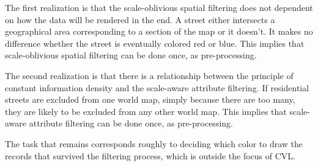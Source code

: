 The first realization is that the scale-oblivious spatial filtering does not dependent on how the data will be rendered in the end. A street either intersects a geographical area corresponding to a section of the map or it doesn't. It makes no difference whether the street is eventually colored red or blue. This implies that scale-oblivious spatial filtering can be done once, as pre-processing.

The second realization is that there is a relationship between the principle of constant information density and the scale-aware attribute filtering. If residential streets are excluded from one world map, simply because there are too many, they are likely to be excluded from any other world map. This implies that scale-aware attribute filtering can be done once, as pre-processing.

The task that remains corresponds roughly to deciding which color to draw the records that survived the filtering process, which is outside the focus of CVL.



